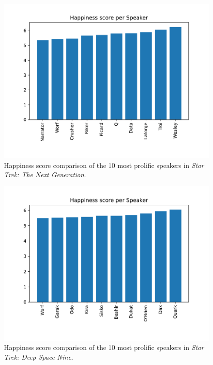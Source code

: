 \begin{figure}
  \centering
  \includegraphics[width=\columnwidth]{figures/localized/tng_happiness_scores.pdf}
  \caption{Happiness score comparison of the 10 most prolific speakers in \textit{Star Trek: The Next Generation}.}
  \label{fig:tng_happiness}
\end{figure}

\begin{figure}
  \centering
  \includegraphics[width=\columnwidth]{figures/localized/ds9_happiness_scores.pdf}
  \caption{Happiness score comparison of the 10 most prolific speakers in \textit{Star Trek: Deep Space Nine}.}
  \label{fig:ds9_happiness}
\end{figure}

